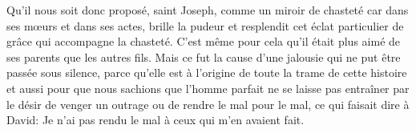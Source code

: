 Qu’il nous soit donc proposé, saint Joseph, comme un miroir de chasteté
	car dans ses mœurs et dans ses actes, brille la pudeur
	et resplendit cet éclat particulier de grâce qui accompagne la chasteté.
C’est même pour cela qu’il était plus aimé de ses parents que les autres fils.
Mais ce fut la cause d’une jalousie qui ne put être passée sous silence,
	parce qu’elle est à l’origine de toute la trame de cette histoire
	et aussi pour que nous sachions que l’homme parfait
		ne se laisse pas entraîner par le désir de venger un outrage
		ou de rendre le mal pour le mal,
	ce qui faisait dire à David:
	Je n’ai pas rendu le mal à ceux qui m’en avaient fait.
